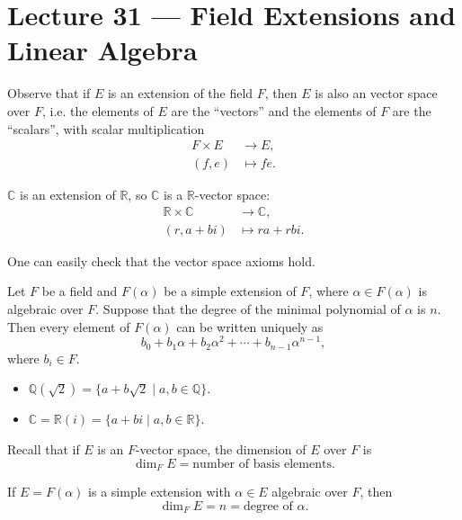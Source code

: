 \section{Lecture 31 — Field Extensions and Linear Algebra}

Observe that if $E$ is an extension of the field $F$, then $E$ is also an vector space over $F$, i.e. the elements of $E$ are the ``vectors'' and the elements of $F$ are the ``scalars'', with scalar multiplication
\begin{align*}
	F\times E&\to E,\\
	(f,e)&\mapsto fe.
\end{align*}

\begin{example}
	$\mathbb C$ is an extension of $\mathbb R$, so $\mathbb C$ is a $\mathbb R$-vector space:
	\begin{align*}
		\mathbb R\times \mathbb C&\to \mathbb C,\\
		(r,a+bi)&\mapsto ra+rbi.
	\end{align*}
\end{example}

One can easily check that the vector space axioms hold.

\begin{theorem}
	Let $F$ be a field and $F(\alpha)$ be a simple extension of $F$, where $\alpha\in F(\alpha)$ is algebraic over $F$. Suppose that the degree of the minimal polynomial of $\alpha$ is $n$. Then every element of $F(\alpha)$ can be written uniquely as
	$$b_0+b_1\alpha+b_2\alpha^2+\cdots+b_{n-1}\alpha^{n-1},$$
	where $b_i\in F$.
\end{theorem}

\begin{example}\phantom{x}
	\begin{itemize}
		\item $\mathbb Q(\sqrt 2)=\{a+b\sqrt 2\mid a,b\in\mathbb Q\}$.
		\item $\mathbb C=\mathbb R(i)=\{a+bi\mid a,b\in\mathbb R\}$.
	\end{itemize}
\end{example}

Recall that if $E$ is an $F$-vector space, the dimension of $E$ over $F$ is
$$\dim_FE=\text{number of basis elements}.$$

\begin{corollary}
	If $E=F(\alpha)$ is a simple extension with $\alpha\in E$ algebraic over $F$, then
	$$\dim_FE=n=\text{degree of $\alpha$}.$$
\end{corollary}

